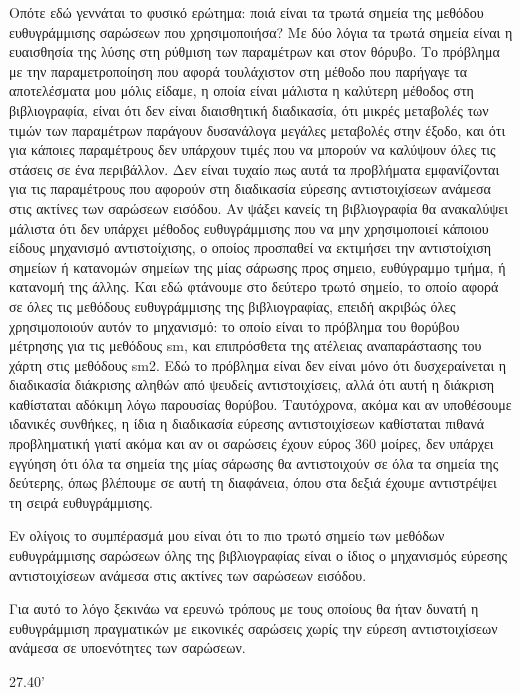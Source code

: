 \documentclass[a4paper,10pt]{article}
\begin{document}
Οπότε εδώ γεννάται το φυσικό ερώτημα: ποιά είναι τα τρωτά σημεία της μεθόδου
ευθυγράμμισης σαρώσεων που χρησιμοποιήσα? Με δύο λόγια τα τρωτά σημεία είναι η
ευαισθησία της λύσης στη ρύθμιση των παραμέτρων και στον θόρυβο. Το πρόβλημα με
την παραμετροποίηση που αφορά τουλάχιστον στη μέθοδο που παρήγαγε τα
αποτελέσματα μου μόλις είδαμε, η οποία είναι μάλιστα η καλύτερη μέθοδος στη
βιβλιογραφία, είναι ότι δεν είναι διαισθητική διαδικασία, ότι μικρές μεταβολές
των τιμών των παραμέτρων παράγουν δυσανάλογα μεγάλες μεταβολές στην έξοδο, και
ότι για κάποιες παραμέτρους δεν υπάρχουν τιμές που να μπορούν να καλύψουν όλες
τις στάσεις σε ένα περιβάλλον. Δεν είναι τυχαίο πως αυτά τα προβλήματα
εμφανίζονται για τις παραμέτρους που αφορούν στη διαδικασία εύρεσης
αντιστοιχίσεων ανάμεσα στις ακτίνες των σαρώσεων εισόδου. Αν ψάξει κανείς τη
βιβλιογραφία θα ανακαλύψει μάλιστα ότι δεν υπάρχει μέθοδος ευθυγράμμισης που να
μην χρησιμοποιεί κάποιου είδους μηχανισμό αντιστοίχισης, ο οποίος προσπαθεί να
εκτιμήσει την αντιστοίχιση σημείων ή κατανομών σημείων της μίας σάρωσης προς
σημειο, ευθύγραμμο τμήμα, ή κατανομή της άλλης. Και εδώ φτάνουμε στο δεύτερο
τρωτό σημείο, το οποίο αφορά σε όλες τις μεθόδους ευθυγράμμισης της
βιβλιογραφίας, επειδή ακριβώς όλες χρησιμοποιούν αυτόν το μηχανισμό: το οποίο
είναι το πρόβλημα του θορύβου μέτρησης για τις μεθόδους sm, και επιπρόσθετα της
ατέλειας αναπαράστασης του χάρτη στις μεθόδους sm2. Εδώ το πρόβλημα είναι δεν
είναι μόνο ότι δυσχεραίνεται η διαδικασία διάκρισης αληθών από ψευδείς
αντιστοιχίσεις, αλλά ότι αυτή η διάκριση καθίσταται αδόκιμη λόγω παρουσίας
θορύβου. Ταυτόχρονα, ακόμα και αν υποθέσουμε ιδανικές συνθήκες, η ίδια η
διαδικασία εύρεσης αντιστοιχίσεων καθίσταται πιθανά προβληματική γιατί ακόμα
και αν οι σαρώσεις έχουν εύρος 360 μοίρες, δεν υπάρχει εγγύηση ότι όλα τα
σημεία της μίας σάρωσης θα αντιστοιχούν σε όλα τα σημεία της δεύτερης, όπως
βλέπουμε σε αυτή τη διαφάνεια, όπου στα δεξιά έχουμε αντιστρέψει τη σειρά
ευθυγράμμισης.

Εν ολίγοις το συμπέρασμά μου είναι ότι το πιο τρωτό σημείο των
μεθόδων ευθυγράμμισης σαρώσεων όλης της βιβλιογραφίας είναι ο ίδιος ο
μηχανισμός εύρεσης αντιστοιχίσεων ανάμεσα στις ακτίνες των σαρώσεων εισόδου.

Για αυτό το λόγο ξεκινάω να ερευνώ τρόπους με τους οποίους θα ήταν δυνατή η
ευθυγράμμιση πραγματικών με εικονικές σαρώσεις χωρίς την εύρεση αντιστοιχίσεων
ανάμεσα σε υποενότητες των σαρώσεων.

27.40'


\end{document}
